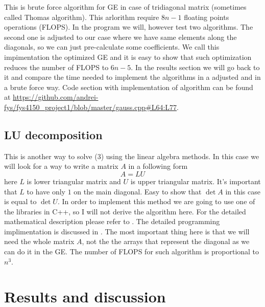 \documentclass[10pt]{article}
\begin{document}
This is brute force algorithm for GE in case of tridiagonal matrix (sometimes called Thomas algorithm). This arlorithm require $ 8n-1 $ floating points operations (FLOPS). In the program we will, however test two algorithms. The second one is adjusted to our case where we have same elements along the diagonals, so we can just pre-calculate some coefficients. We call this impimentation the optimized GE and it is easy to show that such optimization reduces the number of FLOPS to $ 6n-5 $. In the results section we will go back to it and compare the time needed to implement the algorithms in a adjusted and in a brute force way. Code section with implementation of algorithm can be found at \url{https://github.com/andrei-fys/fys4150_project1/blob/master/gauss.cpp#L64:L77}.

\subsection{LU decomposition}
This is another way to solve (3) using the linear algebra methods. In this case we will look for a way to write a matrix $ A $ in a following form
\begin{equation}
A=LU
\end{equation}
here $ L $ is lower triangular matrix and $ U $ is upper triangular matrix. It's important that $ L $ to have only $ 1 $ on the main diagonal. Easy to show that $ \det A $ in this case is equal to $ \det U $. In order to implement this method we are going to use one of the libraries in C++, so I will not derive the algorithm here. For the detailed mathematical description please refer to \cite{one}. The detailed programming implimentation is discussed in \cite{two}.
The most important thing here is that we will need the whole matrix $ A $, not the the arrays that represent the diagonal as we can do it in the GE. The number of FLOPS for such algorithm is proportional to $ n^{3} $.

\newpage
\section{Results and discussion}
\end{document}
